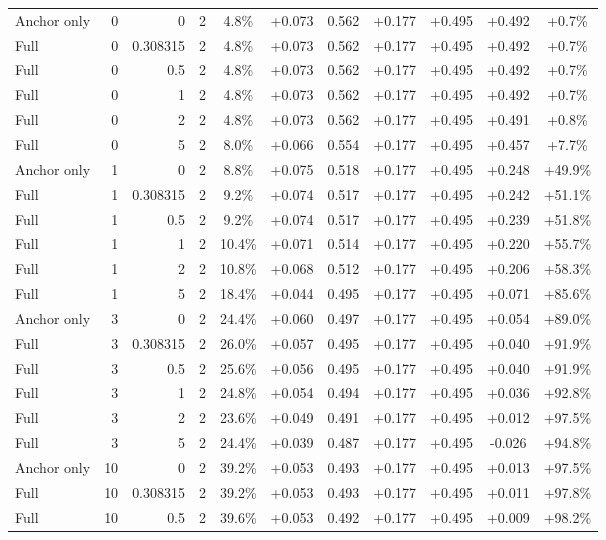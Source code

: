 \begin{table}[htbp]
\begin{tabular}{lrrrccccccc}
Anchor only & 0 & 0 & 2 & 4.8\% & +0.073 & 0.562 & +0.177 & +0.495 & +0.492 & +0.7\% \\
Full & 0 & 0.308315 & 2 & 4.8\% & +0.073 & 0.562 & +0.177 & +0.495 & +0.492 & +0.7\% \\
Full & 0 & 0.5 & 2 & 4.8\% & +0.073 & 0.562 & +0.177 & +0.495 & +0.492 & +0.7\% \\
Full & 0 & 1 & 2 & 4.8\% & +0.073 & 0.562 & +0.177 & +0.495 & +0.492 & +0.7\% \\
Full & 0 & 2 & 2 & 4.8\% & +0.073 & 0.562 & +0.177 & +0.495 & +0.491 & +0.8\% \\
Full & 0 & 5 & 2 & 8.0\% & +0.066 & 0.554 & +0.177 & +0.495 & +0.457 & +7.7\% \\
Anchor only & 1 & 0 & 2 & 8.8\% & +0.075 & 0.518 & +0.177 & +0.495 & +0.248 & +49.9\% \\
Full & 1 & 0.308315 & 2 & 9.2\% & +0.074 & 0.517 & +0.177 & +0.495 & +0.242 & +51.1\% \\
Full & 1 & 0.5 & 2 & 9.2\% & +0.074 & 0.517 & +0.177 & +0.495 & +0.239 & +51.8\% \\
Full & 1 & 1 & 2 & 10.4\% & +0.071 & 0.514 & +0.177 & +0.495 & +0.220 & +55.7\% \\
Full & 1 & 2 & 2 & 10.8\% & +0.068 & 0.512 & +0.177 & +0.495 & +0.206 & +58.3\% \\
Full & 1 & 5 & 2 & 18.4\% & +0.044 & 0.495 & +0.177 & +0.495 & +0.071 & +85.6\% \\
Anchor only & 3 & 0 & 2 & 24.4\% & +0.060 & 0.497 & +0.177 & +0.495 & +0.054 & +89.0\% \\
Full & 3 & 0.308315 & 2 & 26.0\% & +0.057 & 0.495 & +0.177 & +0.495 & +0.040 & +91.9\% \\
Full & 3 & 0.5 & 2 & 25.6\% & +0.056 & 0.495 & +0.177 & +0.495 & +0.040 & +91.9\% \\
Full & 3 & 1 & 2 & 24.8\% & +0.054 & 0.494 & +0.177 & +0.495 & +0.036 & +92.8\% \\
Full & 3 & 2 & 2 & 23.6\% & +0.049 & 0.491 & +0.177 & +0.495 & +0.012 & +97.5\% \\
Full & 3 & 5 & 2 & 24.4\% & +0.039 & 0.487 & +0.177 & +0.495 & -0.026 & +94.8\% \\
Anchor only & 10 & 0 & 2 & 39.2\% & +0.053 & 0.493 & +0.177 & +0.495 & +0.013 & +97.5\% \\
Full & 10 & 0.308315 & 2 & 39.2\% & +0.053 & 0.493 & +0.177 & +0.495 & +0.011 & +97.8\% \\
Full & 10 & 0.5 & 2 & 39.6\% & +0.053 & 0.492 & +0.177 & +0.495 & +0.009 & +98.2\% \\

\end{tabular}
\end{table}
